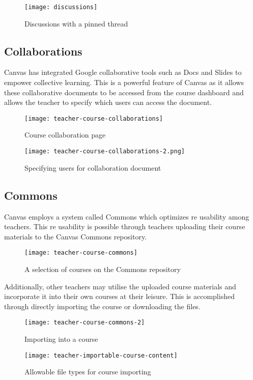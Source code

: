 \begin{figure}[h!]
\centering
\texttt{[image: discussions]}
\caption{Discussions with a pinned thread}
\end{figure}

\subsection{Collaborations}
Canvas has integrated Google collaborative tools such as Docs and Slides to empower collective learning. This is a powerful feature of Canvas as it allows these collaborative documents to be accessed from the course dashboard and allows the teacher to specify which users can access the document.


\begin{figure}[h!]
\centering
\texttt{[image: teacher-course-collaborations]}
\caption{Course collaboration page}
\end{figure}


\begin{figure}[h!]
    \centering
    \texttt{[image: teacher-course-collaborations-2.png]}
    \caption{Specifying users for collaboration document}
\end{figure}

\subsection{Commons}
Canvas employs a system called Commons which optimizes re usability among teachers. This re usability is possible through teachers uploading their course materials to the Canvas Commons repository. 

\begin{figure}[h!]
\centering
\texttt{[image: teacher-course-commons]}
\caption{A selection of courses on the Commons repository}
\end{figure}

Additionally, other teachers may utilise the uploaded course materials and incorporate it into their own courses at their leisure. This is accomplished through directly importing the course or downloading the files.

\begin{figure}
\centering
\texttt{[image: teacher-course-commons-2]}
\caption{Importing into a course}
\end{figure}

\begin{figure}[h!]
\centering
\texttt{[image: teacher-importable-course-content]}
\caption{Allowable file types for course importing}
\end{figure}

